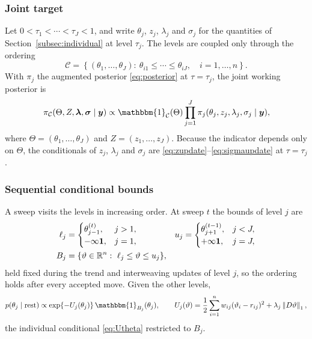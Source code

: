 \subsubsection{Joint target}

Let $0 < \tau_1 < \cdots < \tau_J < 1$, and write $\theta_j$, $z_j$, $\lambda_j$ and $\sigma_j$ for the quantities of Section~\ref{subsec:individual} at level $\tau_j$. The levels are coupled only through the ordering
\begin{equation}
    \mathcal C = \left\{(\theta_1,\ldots,\theta_J):\
    \theta_{i1} \leq \cdots \leq \theta_{iJ},\quad i=1,\ldots,n\right\}.
    \label{eq:joint_order}
\end{equation}
With $\pi_j$ the augmented posterior \eqref{eq:posterior} at $\tau=\tau_j$, the joint working posterior is
\begin{equation}
    \pi_{\mathcal C}(\Theta,Z,\blambda,\bm\sigma\mid\by)
    \propto \mathbbm{1}_{\mathcal C}(\Theta)
    \prod_{j=1}^J \pi_j(\theta_j,z_j,\lambda_j,\sigma_j\mid\by),
    \label{eq:joint_target}
\end{equation}
where $\Theta=(\theta_1,\ldots,\theta_J)$ and $Z=(z_1,\ldots,z_J)$. Because the indicator depends only on $\Theta$, the conditionals of $z_j$, $\lambda_j$ and $\sigma_j$ are \eqref{eq:zupdate}--\eqref{eq:sigmaupdate} at $\tau = \tau_j$.

\subsubsection{Sequential conditional bounds}

A sweep visits the levels in increasing order. At sweep $t$ the bounds of level $j$ are
\begin{equation}
\begin{aligned}
    \ell_j &= \begin{cases}\theta_{j-1}^{(t)}, & j>1,\\ -\infty\mathbf 1, & j=1,\end{cases}
    & u_j &= \begin{cases}\theta_{j+1}^{(t-1)}, & j<J,\\ +\infty\mathbf 1, & j=J,\end{cases} \\
    B_j &= \{\vartheta\in\mathbb{R}^n:\ \ell_j\leq\vartheta\leq u_j\},
\end{aligned}
    \label{eq:joint_box}
\end{equation}
held fixed during the trend and interweaving updates of level $j$, so the ordering holds after every accepted move. Given the other levels,
\begin{equation}
    p(\theta_j \mid \text{rest}) \propto \exp\{-U_j(\theta_j)\}\,\mathbbm{1}_{B_j}(\theta_j), \qquad
    U_j(\vartheta) = \frac12\sum_{i=1}^n w_{ij}(\vartheta_i-r_{ij})^2 + \lambda_j\norm{D\vartheta}_1,
    \label{eq:joint_conditional}
\end{equation}
the individual conditional \eqref{eq:Utheta} restricted to $B_j$.

